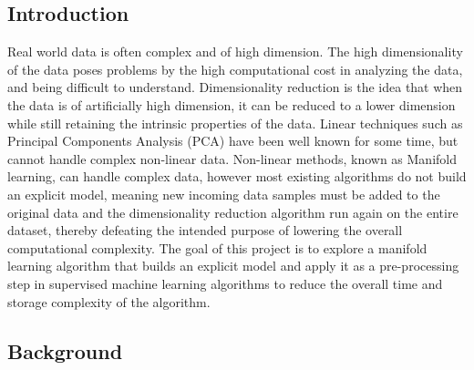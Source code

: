 \documentclass[a0,landscape]{a0poster}
\begin{document}
\begin{multicols}{4} %

\begin{tcolorbox}[colback=white,colframe=black]
    \color{DarkSlateGray}
    \begin{center}\section*{Introduction}\end{center}
\end{tcolorbox}
\color{Black}

Real world data is often complex and of high dimension. The high dimensionality of the data poses problems by the high computational cost in analyzing the data, and being difficult to understand. Dimensionality reduction is the idea that when the data is of artificially high dimension, it can be reduced to a lower dimension while still retaining the intrinsic properties of the data. Linear techniques such as Principal Components Analysis (PCA) have been well known for some time, but cannot handle complex non-linear data. Non-linear methods, known as Manifold learning, can handle complex data, however most existing algorithms do not build an explicit model, meaning new incoming data samples must be added to the original data and the dimensionality reduction algorithm run again on the entire dataset, thereby defeating the intended purpose of lowering the overall computational complexity. The goal of this project is to explore a manifold learning algorithm that builds an explicit model and apply it as a pre-processing step in supervised machine learning algorithms to reduce the overall time and storage complexity of the algorithm.\vspace{0.5cm}
\begin{tcolorbox}[colback=white,colframe=black]
    \color{DarkSlateGray}
    \begin{center}\section*{Background}\end{center}
\end{tcolorbox}
\color{Black}


\end{multicols}
\end{document}
